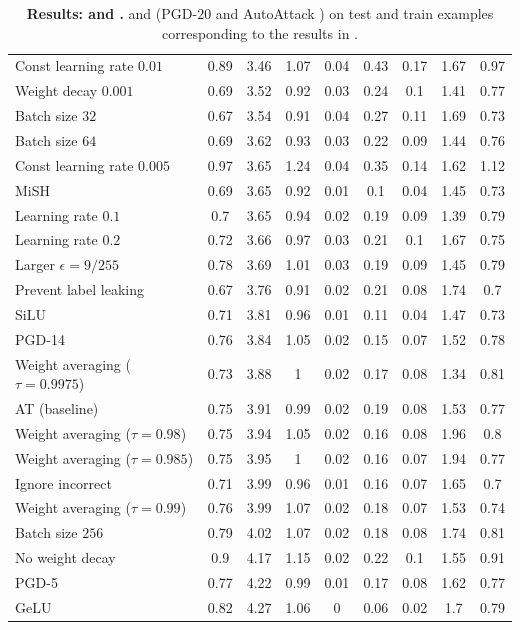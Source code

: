\begin{table}[t]
{\begin{tabularx}{\textwidth}{|X|c|c|c||c|c|c||c|c|}
		Const learning rate $0.01$ & 0.89 & 3.46 & 1.07 & 0.04 & 0.43 & 0.17 & 1.67 & 0.97\\
		Weight decay $0.001$ & 0.69 & 3.52 & 0.92 & 0.03 & 0.24 & 0.1 & 1.41 & 0.77\\
		Batch size $32$ & 0.67 & 3.54 & 0.91 & 0.04 & 0.27 & 0.11 & 1.69 & 0.73\\
		Batch size $64$ & 0.69 & 3.62 & 0.93 & 0.03 & 0.22 & 0.09 & 1.44 & 0.76\\
		Const learning rate $0.005$ & 0.97 & 3.65 & 1.24 & 0.04 & 0.35 & 0.14 & 1.62 & 1.12\\
		MiSH & 0.69 & 3.65 & 0.92 & 0.01 & 0.1 & 0.04 & 1.45 & 0.73\\
		Learning rate $0.1$ & 0.7 & 3.65 & 0.94 & 0.02 & 0.19 & 0.09 & 1.39 & 0.79\\
		Learning rate $0.2$ & 0.72 & 3.66 & 0.97 & 0.03 & 0.21 & 0.1 & 1.67 & 0.75\\
		Larger $\epsilon{=}9/255$ & 0.78 & 3.69 & 1.01 & 0.03 & 0.19 & 0.09 & 1.45 & 0.79\\
		Prevent label leaking & 0.67 & 3.76 & 0.91 & 0.02 & 0.21 & 0.08 & 1.74 & 0.7\\
		SiLU & 0.71 & 3.81 & 0.96 & 0.01 & 0.11 & 0.04 & 1.47 & 0.73\\
		PGD-14 & 0.76 & 3.84 & 1.05 & 0.02 & 0.15 & 0.07 & 1.52 & 0.78\\
		Weight averaging ($\tau{=}0.9975$) & 0.73 & 3.88 & 1 & 0.02 & 0.17 & 0.08 & 1.34 & 0.81\\
		AT (baseline) & 0.75 & 3.91 & 0.99 & 0.02 & 0.19 & 0.08 & 1.53 & 0.77\\
		Weight averaging ($\tau{=}0.98$) & 0.75 & 3.94 & 1.05 & 0.02 & 0.16 & 0.08 & 1.96 & 0.8\\
		Weight averaging ($\tau{=}0.985$) & 0.75 & 3.95 & 1 & 0.02 & 0.16 & 0.07 & 1.94 & 0.77\\
		Ignore incorrect & 0.71 & 3.99 & 0.96 & 0.01 & 0.16 & 0.07 & 1.65 & 0.7\\
		Weight averaging ($\tau{=}0.99$) & 0.76 & 3.99 & 1.07 & 0.02 & 0.18 & 0.07 & 1.53 & 0.74\\
		Batch size $256$ & 0.79 & 4.02 & 1.07 & 0.02 & 0.18 & 0.08 & 1.74 & 0.81\\
		No weight decay & 0.9 & 4.17 & 1.15 & 0.02 & 0.22 & 0.1 & 1.55 & 0.91\\
		PGD-5 & 0.77 & 4.22 & 0.99 & 0.01 & 0.17 & 0.08 & 1.62 & 0.77\\
		GeLU & 0.82 & 4.27 & 1.06 & 0 & 0.06 & 0.02 & 1.7 & 0.79\\
		\hline
	\end{tabularx} 
	}
	\vspace*{-8px}
	\caption{\textbf{Results: \emph{\CE} and \emph{\RCE}.} \CE and \RCE (PGD-$20$ and AutoAttack \cite{CroceICML2020}) on test and train examples corresponding to the results in .}
	\label{tab:supp-table-loss}
	\vspace*{-6px}
\end{table}